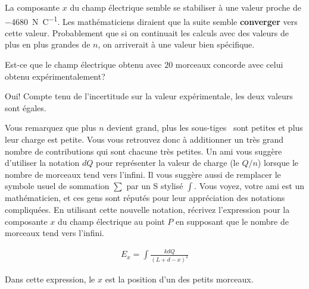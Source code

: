 \begin{reponsebox}
  La composante $x$ du champ électrique semble se stabiliser à une valeur
  proche de \SI{-4680}{\newton\per\coulomb}. Les mathématiciens diraient que
  la suite semble \textbf{converger} vers cette valeur. Probablement que si
  on continuait les calculs avec des valeurs de plus en plus grandes de $n$,
  on arriverait à une valeur bien spécifique.

\end{reponsebox}

Est-ce que le champ électrique obtenu avec $20$ morceaux concorde avec celui
obtenu expérimentalement?

\begin{reponsebox}
  Oui! Compte tenu de l'incertitude sur la valeur expérimentale, les deux
  valeurs sont égales.
\end{reponsebox}



Vous remarquez que plus $n$ devient grand, plus les \og sous-tiges \fg\ sont
petites et plus leur charge est petite. Vous vous retrouvez donc à additionner
un très grand nombre de contributions qui sont chacune très petites. Un ami
vous suggère d'utiliser la notation $dQ$ pour représenter la valeur de charge
(le $Q / n$) lorsque le nombre de morceaux tend vers l'infini. Il vous suggère
aussi de remplacer le symbole usuel de sommation $\sum$ par un S stylisé
$\int$. Vous voyez, votre ami est un mathématicien, et ces gens sont réputés
pour leur appréciation des notations compliquées. En utilisant cette nouvelle
notation, récrivez l'expression pour la composante $x$ du champ électrique au
point $P$ en supposant que le nombre de morceaux tend vers l'infini.

\begin{reponsebox}
  \begin{align*}
    E_{x} = \int \frac{k dQ}{(L + d - x)^2}
  \end{align*}

  Dans cette expression, le $x$ est la position d'un des petits morceaux.
\end{reponsebox}

